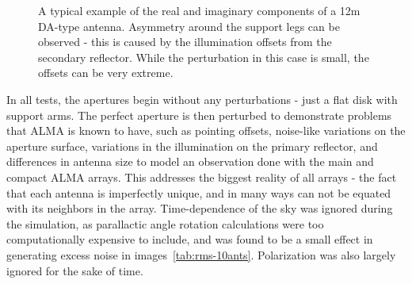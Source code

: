 \documentclass[11pt]{article}
\begin{document}
\begin{figure}
    \centering
    \quad
    \caption{
        A typical example of the real and imaginary components of a 12m DA-type 
        antenna. Asymmetry around the support legs can be observed - this is 
        caused by the illumination offsets from the secondary reflector. While 
        the perturbation in this case is small, the offsets can be very      
        extreme.
     }
    \label{fig:apertures}
\end{figure}

In all tests, the apertures begin without any perturbations - just a flat disk 
with support arms. The perfect aperture is then perturbed to demonstrate 
problems that ALMA is known to have, such as pointing offsets,
noise-like variations on the aperture surface, variations in the illumination 
on the primary reflector, and differences in antenna size to model an 
observation done with the main and compact ALMA arrays. This addresses the 
biggest reality of all arrays - the fact that each antenna is imperfectly 
unique, and in many ways can not be equated with its neighbors in the array.
Time-dependence of the sky was ignored during the simulation, as parallactic 
angle rotation calculations were too computationally expensive to include, and 
was found to be a small effect in generating excess noise in 
images~\ref{tab:rms-10ants}.  Polarization was also largely ignored for the 
sake of time.
\end{document}
